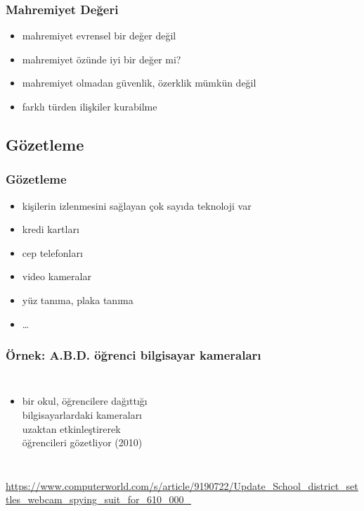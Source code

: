 \documentclass[dvipsnames]{beamer}
\theoremstyle{plain}
\begin{document}
\begin{frame}
  \frametitle{Mahremiyet Değeri}

  \begin{itemize}
    \item mahremiyet evrensel bir değer değil

    \pause
    \bigskip
    \item mahremiyet özünde iyi bir değer mi?
    \smallskip
    \item mahremiyet olmadan güvenlik, özerklik mümkün değil
    \item farklı türden ilişkiler kurabilme
  \end{itemize}
\end{frame}

\subsection{Gözetleme}

\begin{frame}
  \frametitle{Gözetleme}

  \begin{itemize}
    \item kişilerin izlenmesini sağlayan çok sayıda teknoloji var

    \medskip
    \item kredi kartları
    \item cep telefonları
    \item video kameralar
    \item yüz tanıma, plaka tanıma
    \item \ldots
  \end{itemize}
\end{frame}

\begin{frame}
  \frametitle{Örnek: A.B.D. öğrenci bilgisayar kameraları}

  \begin{columns}

    \begin{itemize}
      \item bir okul, öğrencilere dağıttığı\\
        bilgisayarlardaki kameraları\\
        uzaktan etkinleştirerek\\
        öğrencileri gözetliyor (2010)
    \end{itemize}
  \end{columns}

  \medskip
  \tiny{\url{https://www.computerworld.com/s/article/9190722/Update_School_district_settles_webcam_spying_suit_for_610_000_}}\\
\end{frame}
\end{document}
